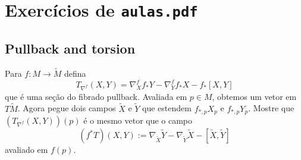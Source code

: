 \section{Exercícios de \texttt{aulas.pdf}}
\iffalse\subsection{Pullback and torsion}
\begin{exercise}\leavevmode
Para \(f: M \to \tilde{M}\) defina
\[T_{\nabla^f}(X,Y)=\nabla_X^f f_*Y-\nabla_Y^f f_*X-f_*[X,Y]\]
que é uma seção do fibrado pullback. Avaliada em \(p\in M\), obtemos um vetor em \(T\tilde{M}\). Agora pegue dois campos \(\tilde{X}\) e \(\tilde{Y}\) que estendem \(f_{*,p}X_p\) e \(f_{*,p}Y_p\). Mostre que \((T_{\nabla^f}(X,Y))(p)\) é o mesmo vetor que o campo
\[(f^* T)(X,Y):=\nabla_{\tilde{X}}\tilde{Y}-\nabla_{\tilde{Y}}\tilde{X}-[\tilde{X},\tilde{Y}]\]
avaliado em \(f(p)\).
\end{exercise}
